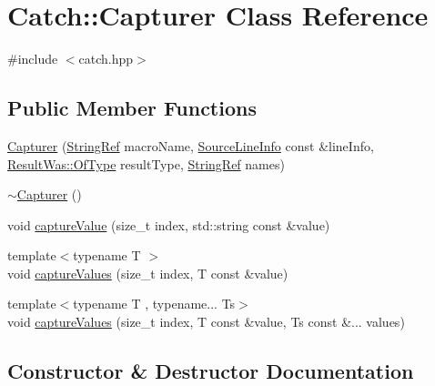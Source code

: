 \hypertarget{class_catch_1_1_capturer}{}\section{Catch\+:\+:Capturer Class Reference}
\label{class_catch_1_1_capturer}


{\ttfamily \#include $<$catch.\+hpp$>$}

\subsection*{Public Member Functions}
\begin{DoxyCompactItemize}
\item 
\mbox{\hyperlink{class_catch_1_1_capturer_a86b0b27acc803a4e1310c10820f3038f}{Capturer}} (\mbox{\hyperlink{class_catch_1_1_string_ref}{String\+Ref}} macro\+Name, \mbox{\hyperlink{struct_catch_1_1_source_line_info}{Source\+Line\+Info}} const \&line\+Info, \mbox{\hyperlink{struct_catch_1_1_result_was_a624e1ee3661fcf6094ceef1f654601ef}{Result\+Was\+::\+Of\+Type}} result\+Type, \mbox{\hyperlink{class_catch_1_1_string_ref}{String\+Ref}} names)
\item 
\mbox{\hyperlink{class_catch_1_1_capturer_aecde85cf69e65565cec91e325a657b82}{$\sim$\+Capturer}} ()
\item 
void \mbox{\hyperlink{class_catch_1_1_capturer_a0695ebf77f7cdcb344c73bcb3d9131e4}{capture\+Value}} (size\+\_\+t index, std\+::string const \&value)
\item 
{\footnotesize template$<$typename T $>$ }\\void \mbox{\hyperlink{class_catch_1_1_capturer_a60d08e6db2e54740bb2298bbbec3bc0b}{capture\+Values}} (size\+\_\+t index, T const \&value)
\item 
{\footnotesize template$<$typename T , typename... Ts$>$ }\\void \mbox{\hyperlink{class_catch_1_1_capturer_a76f2a097cfeb3042688300b81eb9bcbc}{capture\+Values}} (size\+\_\+t index, T const \&value, Ts const \&... values)
\end{DoxyCompactItemize}


\subsection{Constructor \& Destructor Documentation}
\mbox{\label{class_catch_1_1_capturer_a86b0b27acc803a4e1310c10820f3038f}} 
